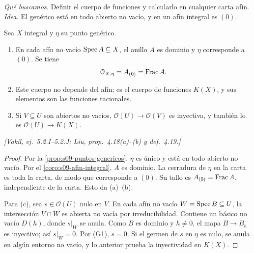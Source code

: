 \emph{Qué buscamos.} Definir el cuerpo de funciones y calcularlo en cualquier carta afín. \emph{Idea.} El genérico está en todo abierto no vacío, y en un afín integral es $(0)$.\par\nopagebreak[4]

\begin{prop}
\label{prop:s09-cuerpo-funciones}
Sea $X$ integral y $\eta$ su punto genérico.
\begin{enumerate}[label=(\alph*)]
\item En cada afín no vacío $\operatorname{Spec} A\subseteq X$, el anillo $A$ es dominio y $\eta$ corresponde a $(0)$. Se tiene
\[
\mathcal O_{X,\eta}=A_{(0)}=\operatorname{Frac} A.
\]
\item Este cuerpo no depende del afín; es el cuerpo de funciones $K(X)$, y sus elementos son las funciones racionales.
\item Si $V\subseteq U$ son abiertos no vacíos, $\mathcal O(U)\to\mathcal O(V)$ es inyectiva, y también lo es $\mathcal O(U)\to K(X)$.
\end{enumerate}
\emph{[Vakil, ej.~5.2.I--5.2.J; Liu, prop.~4.18(a)--(b) y def.~4.19.]}
\end{prop}
\begin{proof}
Por la \cref{prop:s09-puntos-genericos}, $\eta$ es único y está en todo abierto no vacío. Por el \cref{coro:s09-afin-integral}, $A$ es dominio. La cerradura de $\eta$ en la carta es toda la carta, de modo que corresponde a $(0)$. Su tallo es $A_{(0)}=\operatorname{Frac} A$, independiente de la carta. Esto da (a)--(b).

Para (c), sea $s\in\mathcal O(U)$ nulo en $V$. En cada afín no vacío $W=\operatorname{Spec} B\subseteq U$, la intersección $V\cap W$ es abierta no vacía por irreducibilidad. Contiene un básico no vacío $D(h)$, donde $s|_W$ se anula. Como $B$ es dominio y $h\ne0$, el mapa $B\to B_h$ es inyectivo; así $s|_W=0$. Por (G1), $s=0$. Si el germen de $s$ en $\eta$ es nulo, se anula en algún entorno no vacío, y lo anterior prueba la inyectividad en $K(X)$.
\end{proof}

